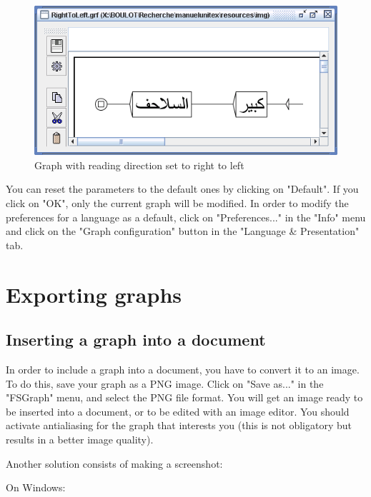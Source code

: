 \bigskip
\begin{figure}[!h]
\begin{center}
\includegraphics[width=14.5cm]{resources/img/fig5-27.png}
\caption{Graph with reading direction set to right to left\label{fig-right-to-left-graph}}
\end{center}
\end{figure}

\bigskip
\noindent You can reset the parameters to the default ones by clicking on
"Default". If you click on "OK", only the current graph will be modified.  In
order to modify the preferences for a language as a default, click on
"Preferences..." in the "Info" menu and click on the "Graph configuration" button 
in the "Language \& Presentation" tab.


\section{Exporting graphs}
\subsection{Inserting a graph into a document}
In order to include a graph into a document, you have to convert it to an image.
To do this, save your graph as a PNG image. Click on "Save as..." in the
"FSGraph" menu, and select the PNG file format. You will get an image ready to be
inserted into a document, or to be edited with an image editor. You should
activate antialiasing for the graph that interests you (this is not obligatory
but results in a better image quality).

\bigskip
\noindent Another solution consists of making a screenshot:

\bigskip
\noindent On Windows:

